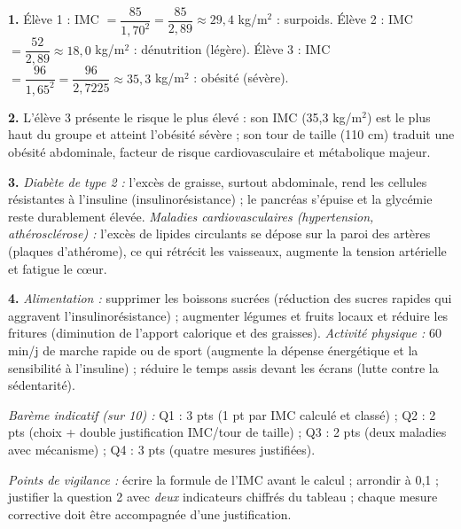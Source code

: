 \documentclass[11pt]{article}
\newcounter{popsec}
\newcounter{popsub}
\newcommand{\courssub}[1]{%
  \stepcounter{popsub}%
  \par\vspace{9pt}\noindent{\popxbold\fontsize{11.5}{13}\selectfont\color{popink}{\color{poporange}\thepopsec.\thepopsub}\hspace{6pt}#1}\par\nopagebreak\vspace{4pt}
}
\begin{document}
\courssub{Je me prépare au Probatoire}

\begin{corrige}
\textbf{1.} Élève 1 : IMC $= \dfrac{85}{1,70^2} = \dfrac{85}{2,89} \approx 29,4$ kg/m$^2$ : surpoids. Élève 2 : IMC $= \dfrac{52}{2,89} \approx 18,0$ kg/m$^2$ : dénutrition (légère). Élève 3 : IMC $= \dfrac{96}{1,65^2} = \dfrac{96}{2,7225} \approx 35,3$ kg/m$^2$ : obésité (sévère).

\textbf{2.} L'élève 3 présente le risque le plus élevé : son IMC (35,3 kg/m$^2$) est le plus haut du groupe et atteint l'obésité sévère ; son tour de taille (110 cm) traduit une obésité abdominale, facteur de risque cardiovasculaire et métabolique majeur.

\textbf{3.} \emph{Diabète de type 2 :} l'excès de graisse, surtout abdominale, rend les cellules résistantes à l'insuline (insulinorésistance) ; le pancréas s'épuise et la glycémie reste durablement élevée. \emph{Maladies cardiovasculaires (hypertension, athérosclérose) :} l'excès de lipides circulants se dépose sur la paroi des artères (plaques d'athérome), ce qui rétrécit les vaisseaux, augmente la tension artérielle et fatigue le cœur.

\textbf{4.} \emph{Alimentation :} supprimer les boissons sucrées (réduction des sucres rapides qui aggravent l'insulinorésistance) ; augmenter légumes et fruits locaux et réduire les fritures (diminution de l'apport calorique et des graisses). \emph{Activité physique :} 60 min/j de marche rapide ou de sport (augmente la dépense énergétique et la sensibilité à l'insuline) ; réduire le temps assis devant les écrans (lutte contre la sédentarité).

\emph{Barème indicatif (sur 10) :} Q1 : 3 pts (1 pt par IMC calculé et classé) ; Q2 : 2 pts (choix + double justification IMC/tour de taille) ; Q3 : 2 pts (deux maladies avec mécanisme) ; Q4 : 3 pts (quatre mesures justifiées).

\emph{Points de vigilance :} écrire la formule de l'IMC avant le calcul ; arrondir à 0,1 ; justifier la question 2 avec \emph{deux} indicateurs chiffrés du tableau ; chaque mesure corrective doit être accompagnée d'une justification.
\end{corrige}
\end{document}
